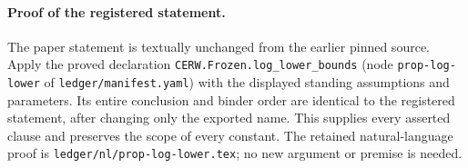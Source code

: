 \paragraph{Proof of the registered statement.}
The paper statement is textually unchanged from the earlier pinned source.
Apply the proved declaration \texttt{CERW.Frozen.log\_lower\_bounds}
(node \texttt{prop-log-lower} of \texttt{ledger/manifest.yaml}) with the displayed
standing assumptions and parameters. Its entire conclusion and binder order
are identical to the registered statement, after changing only the exported
name. This supplies every asserted clause and preserves the scope of every
constant. The retained natural-language proof is
\texttt{ledger/nl/prop-log-lower.tex}; no new argument or premise is needed.
